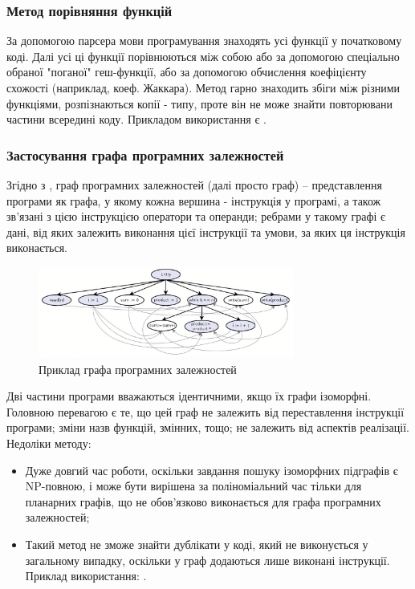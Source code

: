 \documentclass[a4paper, 14pt]{article}
\newcommand{\RNum}[1]{\uppercase\expandafter{\romannumeral #1\relax}}
\begin{document}
\subsubsection{Метод порівняння функцій}
За допомогою парсера мови програмування знаходять усі функції у початковому коді. Далі усі ці функції порівнюються між собою або за допомогою спеціально обраної "поганої" геш-функції, або за допомогою обчислення коефіцієнту схожості (наприклад, коеф. Жаккара).
Метод гарно знаходить збіги між різними функціями, розпізнаються копії \RNum{1}-\RNum{3} типу, проте він не може знайти повторювани частини всередині коду.
Прикладом використання є \cite{Yang18}.
\subsubsection{Застосування графа програмних залежностей}
Згідно з \cite{Ferrante87}, граф програмних залежностей (далі просто граф) -- представлення програми як графа, у якому кожна вершина - інструкція у програмі, а також зв'язані з цією інструкцією оператори та операнди; ребрами у такому графі є дані, від яких залежить виконання цієї інструкції та умови, за яких ця інструкція виконається.
\begin{figure}[h]
    \centering
    \includegraphics[width=0.75\textwidth]{pdg-example}
    \caption{Приклад графа програмних залежностей \cite{pdg-example}}
    \label{fig:pdg-example}
\end{figure} 
Дві частини програми вважаються ідентичними, якщо їх графи ізоморфні.
Головною перевагою є те, що цей граф не залежить від переставлення інструкції програми; зміни назв функцій, змінних, тощо; не залежить від аспектів реалізації.
Недоліки методу:
\begin{itemize}
\item Дуже довгий час роботи, оскільки завдання пошуку ізоморфних підграфів є NP-повною, і може бути вирішена за поліноміальний час тільки для планарних графів, що не обов'язково виконається для графа програмних залежностей;
\item Такий метод не зможе знайти дублікати у коді, який не виконується у загальному випадку, оскільки у граф додаються лише виконані інструкції.
Приклад використання: \cite{Liu06}.
\end{itemize}
\end{document}
